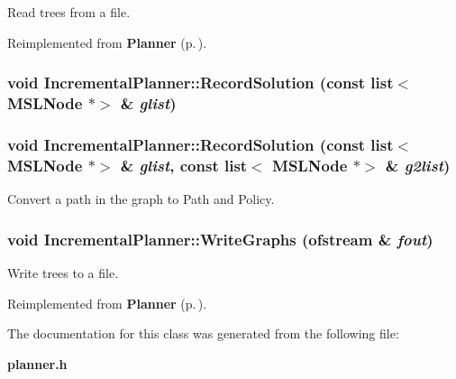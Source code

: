 Read trees from a file.



Reimplemented from {\bf Planner} {\rm (p.\,\pageref{class_Planner_a6})}.
\subsubsection{\setlength{\rightskip}{0pt plus 5cm}void Incremental\-Planner::Record\-Solution (const list$<$ {\bf MSLNode} $\ast$$>$ \& {\em glist})}\label{class_IncrementalPlanner_a4}


\subsubsection{\setlength{\rightskip}{0pt plus 5cm}void Incremental\-Planner::Record\-Solution (const list$<$ {\bf MSLNode} $\ast$$>$ \& {\em glist}, const list$<$ {\bf MSLNode} $\ast$$>$ \& {\em g2list})}\label{class_IncrementalPlanner_a3}


Convert a path in the graph to Path and Policy.

\subsubsection{\setlength{\rightskip}{0pt plus 5cm}void Incremental\-Planner::Write\-Graphs (ofstream \& {\em fout})\hspace{0.3cm}{\tt  [virtual]}}\label{class_IncrementalPlanner_a5}


Write trees to a file.



Reimplemented from {\bf Planner} {\rm (p.\,\pageref{class_Planner_a5})}.

The documentation for this class was generated from the following file:\begin{CompactItemize}
\item 
{\bf planner.h}\end{CompactItemize}
